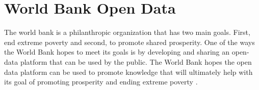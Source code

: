 \section{World Bank Open Data}

The world bank is a philanthropic organization that has two main goals.
First, end extreme poverty and second, to promote shared prosperity.
One of the ways the World Bank hopes to meet its goals is by developing
and sharing an open-data platform that can be used by the public.
The World Bank hopes the open data platform can be used to promote knowledge
that will ultimately help with its goal of promoting prosperity and ending
extreme poverty \cite{Bank2018}.
